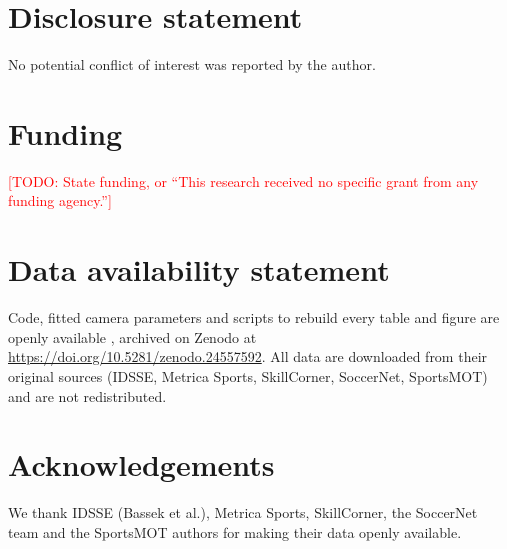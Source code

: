 \documentclass[11pt]{article}
\newcommand{\todo}[1]{\textcolor{red}{[TODO: #1]}}
\begin{document}
\section*{Disclosure statement}
No potential conflict of interest was reported by the author.

\section*{Funding}
\todo{State funding, or ``This research received no specific grant from any funding agency.''}

\section*{Data availability statement}
Code, fitted camera parameters and scripts to rebuild every table and figure are openly available
\citep{pitchlens}, archived on Zenodo at \url{https://doi.org/10.5281/zenodo.24557592}. All data are downloaded from their original sources
(IDSSE, Metrica Sports, SkillCorner, SoccerNet, SportsMOT) and are not redistributed.

\section*{Acknowledgements}
We thank IDSSE (Bassek et al.), Metrica Sports, SkillCorner, the SoccerNet team and the SportsMOT authors for making
their data openly available.



\end{document}
